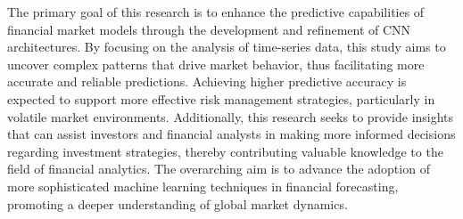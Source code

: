 \thesisspacing %

The primary goal of this research is to enhance the predictive capabilities of financial market models through the development and refinement of CNN architectures. By focusing on the analysis of time-series data, this study aims to uncover complex patterns that drive market behavior, thus facilitating more accurate and reliable predictions. Achieving higher predictive accuracy is expected to support more effective risk management strategies, particularly in volatile market environments. Additionally, this research seeks to provide insights that can assist investors and financial analysts in making more informed decisions regarding investment strategies, thereby contributing valuable knowledge to the field of financial analytics. The overarching aim is to advance the adoption of more sophisticated machine learning techniques in financial forecasting, promoting a deeper understanding of global market dynamics.

